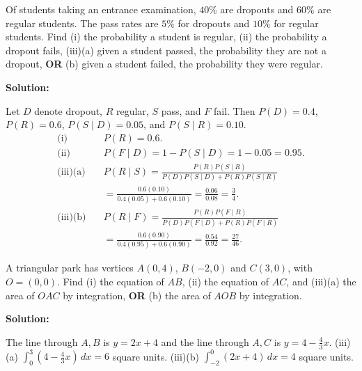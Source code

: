 \documentclass[journal]{IEEEtran}
\begin{document}
\begin{list}{}
\newpage
\item[3.1.37] Of students taking an entrance examination, $40\%$ are dropouts and $60\%$ are regular students. The pass rates are $5\%$ for dropouts and $10\%$ for regular students. Find (i) the probability a student is regular, (ii) the probability a dropout fails, (iii)(a) given a student passed, the probability they are not a dropout, \textbf{OR} (b) given a student failed, the probability they were regular.

\vspace{0.6em}\par\noindent\textbf{Solution:}

Let $D$ denote dropout, $R$ regular, $S$ pass, and $F$ fail. Then $P(D)=0.4$, $P(R)=0.6$, $P(S\mid D)=0.05$, and $P(S\mid R)=0.10$.
\begin{align*}
\text{(i)}\quad&P(R)=\boxed{0.6}.\\
\text{(ii)}\quad&P(F\mid D)=1-P(S\mid D)=1-0.05=\boxed{0.95}.\\[2pt]
\text{(iii)(a)}\quad&P(R\mid S)=\frac{P(R)P(S\mid R)}{P(D)P(S\mid D)+P(R)P(S\mid R)}\\
&=\frac{0.6(0.10)}{0.4(0.05)+0.6(0.10)}=\frac{0.06}{0.08}=\boxed{\frac34}.\\[2pt]
\text{(iii)(b)}\quad&P(R\mid F)=\frac{P(R)P(F\mid R)}{P(D)P(F\mid D)+P(R)P(F\mid R)}\\
&=\frac{0.6(0.90)}{0.4(0.95)+0.6(0.90)}=\frac{0.54}{0.92}=\boxed{\frac{27}{46}}.
\end{align*}

\item[3.1.38] A triangular park has vertices $A(0,4)$, $B(-2,0)$ and $C(3,0)$, with $O=(0,0)$. Find (i) the equation of $AB$, (ii) the equation of $AC$, and (iii)(a) the area of $OAC$ by integration, \textbf{OR} (b) the area of $AOB$ by integration.

\vspace{0.6em}\par\noindent\textbf{Solution:}

The line through $A,B$ is $\boxed{y=2x+4}$ and the line through $A,C$ is $\boxed{y=4-\frac43x}$. (iii)(a) $\int_0^3(4-\frac43x)\,dx=\boxed{6}$ square units. (iii)(b) $\int_{-2}^0(2x+4)\,dx=\boxed{4}$ square units.
\end{list}
\end{document}
